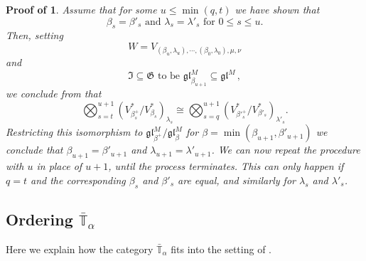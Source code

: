 \documentclass[11pt]{article}
\theoremstyle{plain}
\theoremstyle{nonumberplain}
\theoremstyle{plain}
\theoremstyle{nonumberplain}
\newtheorem{proof-of-simples}{Proof of \Cref{pr.simples}}
\newcommand\bT{\mathbb T}
\newcommand\fG{\mathfrak{G}}
\newcommand\fgl{\mathfrak{gl}}
\begin{document}
\begin{proof-of-simples}
Assume that for some $u\le\min (q,t)$ we have shown that
\begin{equation*}
  \beta_s=\beta'_s\text{ and } \lambda_s=\lambda'_s\text{ for } 0\le s\le u.
\end{equation*}
Then, setting 
\begin{equation*}
   W={ V_{(\beta_u,\lambda_u),\cdots,(\beta_{0},\lambda_{0}),\mu,\nu}}
\end{equation*}
and 
\begin{equation*}
  \mathfrak{I} \subseteq \fG \text{ to be } \fgl^M_{\beta_{u+1}}\subseteq \fgl^M\,,
\end{equation*}
 we conclude from  that 
 \begin{equation*}
   \bigotimes_{s=t}^{u+1}(V^*_{\beta_s^+}/V^*_{\beta_s})_{\lambda_s} \cong  \bigotimes_{s=q}^{u+1}(V^*_{\beta'^+_s}/V^*_{\beta'_s})_{\lambda'_s}.
 \end{equation*}
 Restricting this isomorphism to $\fgl^M_{\beta^+}/\fgl^M_\beta$ for
 $\beta=\min(\beta_{u+1},\beta'_{u+1})$ we conclude that
 $\beta_{u+1}=\beta'_{u+1}$ and $\lambda_{u+1}=\lambda'_{u+1}$. We can
 now repeat the procedure with $u$ in place of $u+1$, until the
 process terminates. This can only happen if $q=t$ and the
 corresponding $\beta_s$ and $\beta'_s$ are equal, and similarly for
 $\lambda_s$ and $\lambda'_s$.
\end{proof-of-simples}






\subsection{Ordering $\bar{\bT}_\alpha$}\label{subse.order}


Here we explain how the category $\bar{\bT}_\alpha$ fits
into the setting of .
\end{document}
